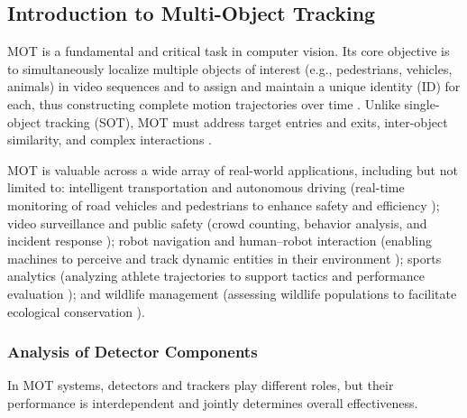 \bigskip

\subsection{Introduction to Multi-Object Tracking}
MOT is a fundamental and critical task in computer vision. Its core objective is to simultaneously localize multiple objects of interest (e.g., pedestrians, vehicles, animals) in video sequences and to assign and maintain a unique identity (ID) for each, thus constructing complete motion trajectories over time \cite{103,116,152}. Unlike single-object tracking (SOT), MOT must address target entries and exits, inter-object similarity, and complex interactions \cite{86}.

MOT is valuable across a wide array of real-world applications, including but not limited to: intelligent transportation and autonomous driving (real-time monitoring of road vehicles and pedestrians to enhance safety and efficiency \cite{162}); video surveillance and public safety (crowd counting, behavior analysis, and incident response \cite{60_wang_catrack_2025}); robot navigation and human–robot interaction (enabling machines to perceive and track dynamic entities in their environment \cite{160}); sports analytics (analyzing athlete trajectories to support tactics and performance evaluation \cite{200}); and wildlife management (assessing wildlife populations to facilitate ecological conservation \cite{169}).

\subsubsection{Analysis of Detector Components}

In MOT systems, detectors and trackers play different roles, but their performance is interdependent and jointly determines overall effectiveness.

